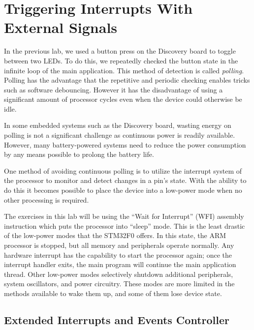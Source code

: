 \documentclass[11pt,fleqn]{book} %
\begin{document}

\section{Triggering Interrupts With External Signals}

In the previous lab, we used a button press on the Discovery board to toggle between two LEDs. To do this, we repeatedly checked the button state in the infinite loop of the main application. This method of detection is called \textit{polling}. Polling has the advantage that the repetitive and periodic checking enables tricks such as software debouncing. However it has the disadvantage of using a significant amount of processor cycles even when the device could otherwise be idle. 

In some embedded systems such as the Discovery board, wasting energy on polling is not a significant challenge as continuous power is readily available. However, many battery-powered systems need to reduce the power consumption by any means possible to prolong the battery life.

One method of avoiding continuous polling is to utilize the interrupt system of the processor to monitor and detect changes in a pin's state. With the ability to do this it becomes possible to place the device into a low-power mode when no other processing is required. 

The exercises in this lab will be using the ``Wait for Interrupt'' (WFI) assembly instruction which puts the processor into ``sleep'' mode. This is the least drastic of the low-power modes that the STM32F0 offers. In this state, the ARM processor is stopped, but all memory and peripherals operate normally. Any hardware interrupt has the capability to start the processor again; once the interrupt handler exits, the main program will continue the main application thread. Other low-power modes selectively shutdown additional peripherals, system oscillators, and power circuitry. These modes are more limited in the methods available to wake them up, and some of them lose device state.  

\subsection{Extended Interrupts and Events Controller}
\end{document}
